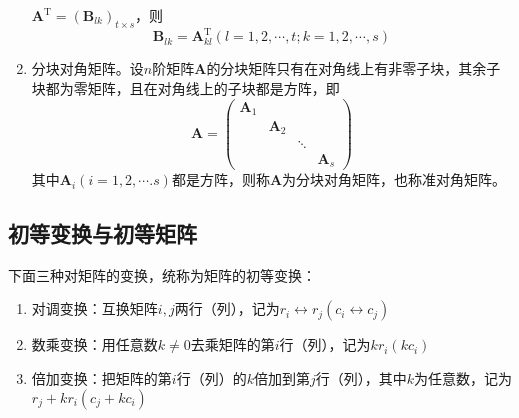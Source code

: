 \begin{theorem}
\begin{enumerate}
        $\boldsymbol{A}^\mathrm{T}={(\boldsymbol{B}_{lk})}_{t\times s}$，则$$\boldsymbol{B}_{lk}=\boldsymbol{A}^\mathrm{T}_{kl}(l=1,2,\cdots,t;k=1,2,\cdots,s)$$
        \item 分块对角矩阵。设$n$阶矩阵$\boldsymbol{A}$的分块矩阵只有在对角线上有非零子块，其余子块都为零矩阵，且在对角线上的子块都是方阵，即
        $$
        \boldsymbol{A}=\left(\begin{array}{cccc}
        \boldsymbol{A}_{1} & & & \\
        & \boldsymbol{A}_{2} & & \\
        & & \ddots & \\
        & & & \boldsymbol{A}_{s}
        \end{array}\right)
        $$
        其中$\boldsymbol{A}_i(i=1,2,\cdots.s)$都是方阵，则称$\boldsymbol{A}$为分块对角矩阵，也称{\heiti 准对角矩阵}。
    \end{enumerate}    
\end{theorem}

\subsection{初等变换与初等矩阵}
\begin{definition}[初等变换]
    下面三种对矩阵的变换，统称为矩阵的初等变换：
    \begin{enumerate}
        \item 对调变换：互换矩阵$i,j$两行（列），记为$r_i\leftrightarrow r_j(c_i\leftrightarrow c_j)$
        \item 数乘变换：用任意数$k\neq 0$去乘矩阵的第$i$行（列），记为$kr_i(kc_i)$
        \item 倍加变换：把矩阵的第$i$行（列）的$k$倍加到第$j$行（列），其中$k$为任意数，记为$r_j+kr_i(c_j+kc_i)$
    \end{enumerate}
\end{definition}

